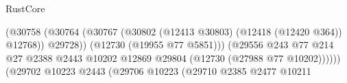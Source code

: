 \begin{lexlean}{RustCore}
\begin{coremodule}
                                                                          (@30758
                                                                            (@30764
                                                                              (@30767
                                                                                (@30802
                                                                                  (@12413 @30803)
                                                                                  (@12418
                                                                                    (@12420 @364))
                                                                                  @12768))
                                                                              @29728))
                                                                          (@12730
                                                                            (@19955 @77 @5851)))
                                                                        (@29556
                                                                          @243
                                                                          @77
                                                                          @214
                                                                          @27
                                                                          @2388
                                                                          @2443
                                                                          @10202
                                                                          @12869
                                                                          @29804
                                                                          (@12730
                                                                            (@27988 @77 @10202))))))
                                                                  (@29702
                                                                    @10223
                                                                    @2443
                                                                    (@29706
                                                                      @10223
                                                                      (@29710
                                                                        @2385
                                                                        @2477
                                                                        @10211

\end{coremodule}
\end{lexlean}
